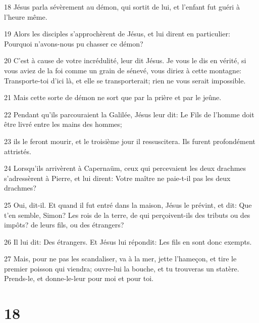 \par 18 Jésus parla sévèrement au démon, qui sortit de lui, et l'enfant fut guéri à l'heure même.
\par 19 Alors les disciples s'approchèrent de Jésus, et lui dirent en particulier: Pourquoi n'avons-nous pu chasser ce démon?
\par 20 C'est à cause de votre incrédulité, leur dit Jésus. Je vous le dis en vérité, si vous aviez de la foi comme un grain de sénevé, vous diriez à cette montagne: Transporte-toi d'ici là, et elle se transporterait; rien ne vous serait impossible.
\par 21 Mais cette sorte de démon ne sort que par la prière et par le jeûne.
\par 22 Pendant qu'ils parcouraient la Galilée, Jésus leur dit: Le Fils de l'homme doit être livré entre les mains des hommes;
\par 23 ils le feront mourir, et le troisième jour il ressuscitera. Ils furent profondément attristés.
\par 24 Lorsqu'ils arrivèrent à Capernaüm, ceux qui percevaient les deux drachmes s'adressèrent à Pierre, et lui dirent: Votre maître ne paie-t-il pas les deux drachmes?
\par 25 Oui, dit-il. Et quand il fut entré dans la maison, Jésus le prévint, et dit: Que t'en semble, Simon? Les rois de la terre, de qui perçoivent-ils des tributs ou des impôts? de leurs fils, ou des étrangers?
\par 26 Il lui dit: Des étrangers. Et Jésus lui répondit: Les fils en sont donc exempts.
\par 27 Mais, pour ne pas les scandaliser, va à la mer, jette l'hameçon, et tire le premier poisson qui viendra; ouvre-lui la bouche, et tu trouveras un statère. Prends-le, et donne-le-leur pour moi et pour toi.

\chapter{18}


